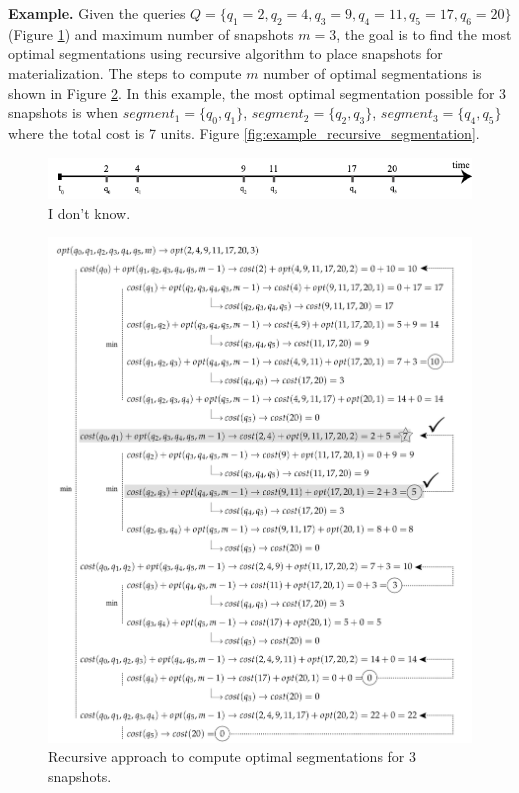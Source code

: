 \textbf{Example.} Given the queries $Q=\{q_1=2,q_2=4,q_3=9,q_4=11,q_5=17,q_6=20\}$ (Figure \ref{fig:example_recursive_queries}) and maximum number of snapshots $m=3$, the goal is to find the most optimal segmentations using recursive algorithm to place snapshots for materialization. The steps to compute $m$ number of optimal segmentations is shown in Figure \ref{fig:example_recursive_steps}. In this example, the most optimal segmentation possible for 3 snapshots is when $segment_1 = \{q_0,q_1\}$, $segment_2 = \{q_2,q_3\}$, $segment_3= \{q_4,q_5\}$ where the total cost is 7 units. Figure \ref{fig:example_recursive_segmentation}.

\begin{figure}[b]
	\centering
	\includegraphics[width=\textwidth]{figs/example_recursive_q.pdf}
	\caption{I don't know.}
	\label{fig:example_recursive_queries}
\end{figure}

\begin{figure}
	\centering
	\includegraphics[width=\textwidth]{figs/recursion_example.pdf}
	\caption{Recursive approach to compute optimal segmentations for 3 snapshots.}
	\label{fig:example_recursive_steps}
\end{figure}


